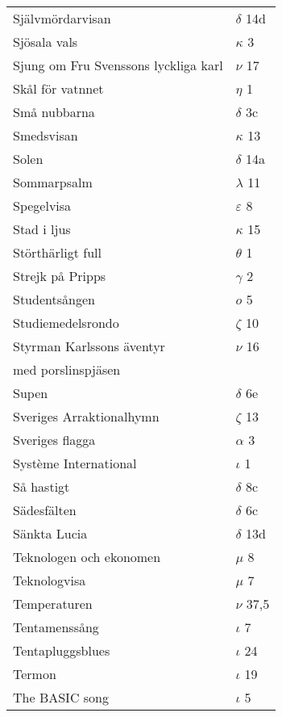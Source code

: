 \documentclass[a6paper,10pt]{article}
\begin{document}
\newpage
\setlength{\oddsidemargin}{-0.37in}
\begin{table}[!h]
\begin{tabular}{l l}
Självmördarvisan&	$\delta$ 14d\\
Sjösala vals	&$\kappa$ 3\\
Sjung om Fru Svenssons lyckliga karl&	$\nu$ 17\\
Skål för vatnnet&	$\eta$ 1\\
Små nubbarna&	$\delta$ 3c\\
Smedsvisan	&$\kappa$ 13\\
Solen	&$\delta$ 14a\\
Sommarpsalm	&$\lambda$ 11\\
Spegelvisa&	$\varepsilon$ 8\\
Stad i ljus&       $\kappa$ 15\\
Störthärligt full&	$\theta$ 1\\
Strejk på Pripps&	$\gamma$ 2\\
Studentsången&	$o$ 5\\
Studiemedelsrondo&$\zeta$ 10\\
Styrman Karlssons äventyr &$\nu$ 16\\
med porslinspjäsen	&\\
Supen	&$\delta$ 6e\\
Sveriges Arraktionalhymn	&$\zeta$ 13\\
Sveriges flagga	&$\alpha$ 3\\
Système International&	$\iota$ 1\\
Så hastigt	&$\delta$ 8c\\
Sädesfälten	&$\delta$ 6c\\
Sänkta Lucia	&$\delta$ 13d\\
Teknologen och ekonomen&$\mu$ 8\\
Teknologvisa	&$\mu$ 7\\
Temperaturen	&$\nu$ 37,5\\
Tentamenssång&	$\iota$ 7\\
Tentapluggsblues&$\iota$ 24\\
Termon&	$\iota$ 19\\
The BASIC song	&$\iota$ 5\\
\end{tabular}
\end{table}
\end{document}
